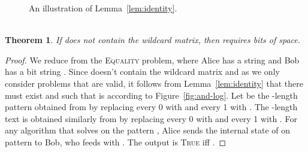 \documentclass{article}
\newcommand{\TRUE}{\textsc{True}\xspace}
\newcommand{\equality}{\textsc{Equality}\xspace}
\theoremstyle{plain}
\newtheorem{theorem}{Theorem}[]
\theoremstyle{definition}
\begin{document}
\begin{figure}[t]
       \vspace{-5pt}
       
        \caption{\label{fig:identity}An illustration of Lemma~\ref{lem:identity}.\\~}
\end{figure}

\begin{theorem}
    \label{thm:and-log}
    If  does not contain the wildcard matrix, then  requires  bits of space.
\end{theorem}
\begin{proof}
    We reduce from the \equality problem, where Alice has a string  and Bob has a bit string . Since  doesn't contain the wildcard matrix and as we only consider problems  that are valid, it follows from Lemma~\ref{lem:identity} that there must exist  and  such that  is according to Figure~\ref{fig:and-log}.
    Let  be the -length pattern obtained from  by replacing every 0 with  and every 1 with . The -length text  is obtained similarly from  by replacing every 0 with  and every 1 with . For any algorithm  that solves  on the pattern , Alice sends the internal state of  on pattern  to Bob, who feeds  with . The output is \TRUE iff .
\end{proof}
\end{document}
